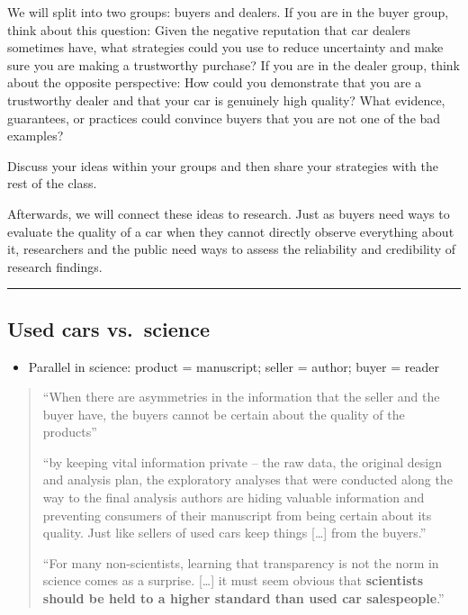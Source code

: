 \documentclass[
  english,
  letterpaper,
  DIV=11,
  numbers=noendperiod]{scrartcl}
\providecommand{\tightlist}{%
  \setlength{\itemsep}{0pt}\setlength{\parskip}{0pt}}
\begin{document}
We will split into two groups: buyers and dealers. If you are in the
buyer group, think about this question: Given the negative reputation
that car dealers sometimes have, what strategies could you use to reduce
uncertainty and make sure you are making a trustworthy purchase? If you
are in the dealer group, think about the opposite perspective: How could
you demonstrate that you are a trustworthy dealer and that your car is
genuinely high quality? What evidence, guarantees, or practices could
convince buyers that you are not one of the bad examples?

Discuss your ideas within your groups and then share your strategies
with the rest of the class.

Afterwards, we will connect these ideas to research. Just as buyers need
ways to evaluate the quality of a car when they cannot directly observe
everything about it, researchers and the public need ways to assess the
reliability and credibility of research findings.

\begin{center}\rule{0.5\linewidth}{0.5pt}\end{center}

\subsection{Used cars vs.~science}\label{used-cars-vs.-science}

\begin{itemize}
\tightlist
\item
  Parallel in science: product = manuscript; seller = author; buyer =
  reader
\end{itemize}

\begin{quote}
``When there are asymmetries in the information that the seller and the
buyer have, the buyers cannot be certain about the quality of the
products''

``by keeping vital information private -- the raw data, the original
design and analysis plan, the exploratory analyses that were conducted
along the way to the final analysis authors are hiding valuable
information and preventing consumers of their manuscript from being
certain about its quality. Just like sellers of used cars keep things
{[}\ldots{]} from the buyers.''

``For many non-scientists, learning that transparency is not the norm in
science comes as a surprise. {[}\ldots{]} it must seem obvious that
\textbf{scientists should be held to a higher standard than used car
salespeople}.''
\end{quote}
\end{document}
